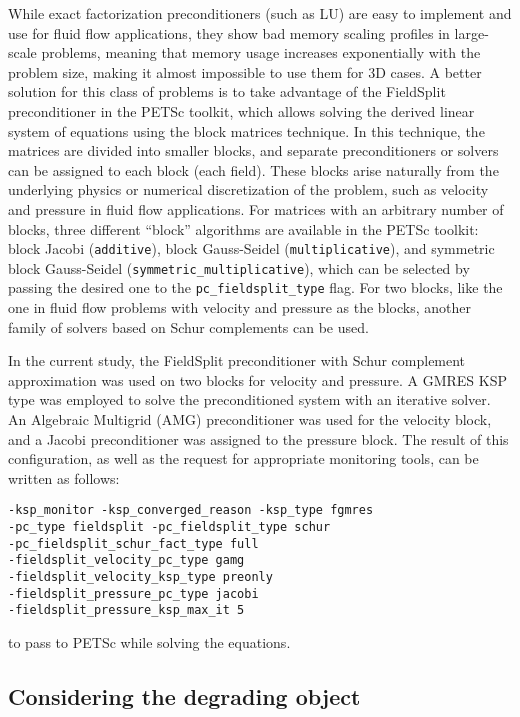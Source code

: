 While exact factorization preconditioners (such as LU) are easy to implement and use for fluid flow applications, they show bad memory scaling profiles in large-scale problems, meaning that memory usage increases exponentially with the problem size, making it almost impossible to use them for 3D cases. A better solution for this class of problems is to take advantage of the FieldSplit preconditioner in the \gls{PETSc} toolkit, which allows solving the derived linear system of equations using the block matrices technique. In this technique, the matrices are divided into smaller blocks, and separate preconditioners or solvers can be assigned to each block (each field). These blocks arise naturally from the underlying physics or numerical discretization of the problem, such as velocity and pressure in fluid flow applications. For matrices with an arbitrary number of blocks, three different ``block'' algorithms are available in the \gls{PETSc} toolkit: block Jacobi (\verb|additive|), block Gauss-Seidel (\verb|multiplicative|), and symmetric block Gauss-Seidel (\verb|symmetric_multiplicative|), which can be selected by passing the desired one to the \verb|pc_fieldsplit_type| flag. For two blocks, like the one in fluid flow problems with velocity and pressure as the blocks, another family of solvers based on Schur complements can be used.


In the current study, the FieldSplit preconditioner with Schur complement approximation was used on two blocks for velocity and pressure. A \gls{GMRES} \gls{KSP} type \cite{Saad1986} was employed to solve the preconditioned system with an iterative solver. An Algebraic Multigrid (\gls{AMG}) preconditioner \cite{mccormick1987} was used for the velocity block, and a Jacobi preconditioner was assigned to the pressure block. The result of this configuration, as well as the request for appropriate monitoring tools, can be written as follows:
\begin{verbatim}
-ksp_monitor -ksp_converged_reason -ksp_type fgmres
-pc_type fieldsplit -pc_fieldsplit_type schur
-pc_fieldsplit_schur_fact_type full
-fieldsplit_velocity_pc_type gamg
-fieldsplit_velocity_ksp_type preonly
-fieldsplit_pressure_pc_type jacobi
-fieldsplit_pressure_ksp_max_it 5 \end{verbatim}
to pass to \gls{PETSc} while solving the equations.


\subsection{Considering the degrading object}

